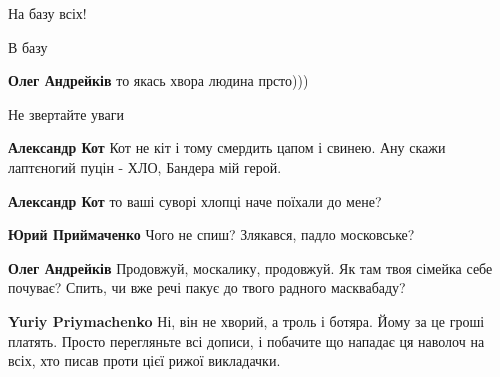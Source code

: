 \begin{itemize}
\begin{itemize}

На базу всіх!


В базу


\textbf{Олег Андрейків} то якась хвора людина прсто)))


Не звертайте уваги


\textbf{Александр Кот} Кот не кіт і тому смердить цапом і свинею. Ану скажи лаптєногий пуцін - ХЛО, Бандера мій герой. 🤣


\textbf{Александр Кот} то ваші суворі хлопці наче поїхали до мене?


\textbf{Юрий Приймаченко} Чого не спиш? Злякався, падло московське?


\textbf{Олег Андрейків} Продовжуй, москалику, продовжуй. Як там твоя сімейка
себе почуває? Спить, чи вже речі пакує до твого радного масквабаду?


\textbf{Yuriy Priymachenko} Ні, він не хворий, а троль і ботяра. Йому за це гроші платять.
Просто перегляньте всі дописи, і побачите що нападає ця наволоч на всіх, хто писав проти цієї рижої викладачки.



\end{itemize}
\end{itemize}
